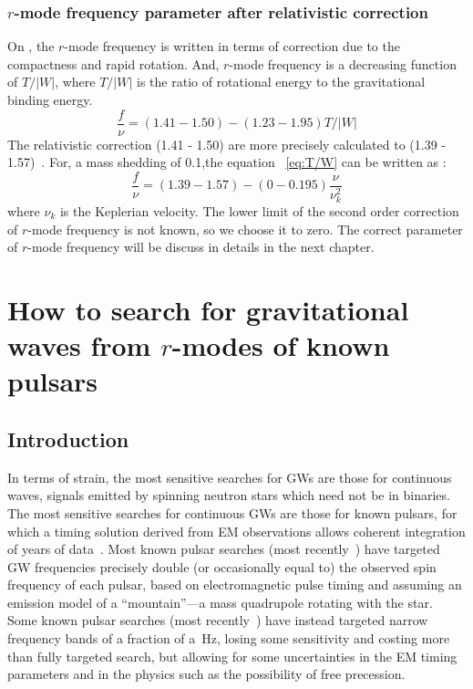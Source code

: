 \documentclass{ttuthes2007}
\begin{document}
\subsection{$r$-mode frequency parameter after relativistic correction}
On \cite{Yoshida:2004gk} , the $r$-mode frequency is written in terms of correction due to the
compactness and rapid rotation. And, $r$-mode frequency is a decreasing function
of $T/|W|$, where $T/|W|$ is the ratio of rotational energy to the gravitational
binding energy. 
\begin{equation}\label{eq:T/W}
\frac{f}{\nu}=(1.41 - 1.50) - (1.23-1.95)T/|W|
\end{equation}	
The relativistic correction (1.41 - 1.50) are more precisely calculated to (1.39
- 1.57)~\cite{Idrisy_2015}. For, a mass shedding of 0.1,the equation ~\ref{eq:T/W} can be written as :
\begin{equation}
\frac{f}{\nu}=(1.39 - 1.57) - (0-0.195)\frac{\nu}{\nu_k^2}
\end{equation}	
where $\nu_k$ is the Keplerian velocity. The lower limit of the second order
correction of $r$-mode frequency is not known, so we choose it to zero. The
correct parameter of $r$-mode frequency will be discuss in details in the next
chapter. 

\chapter{How to search for gravitational waves from $r$-modes of known pulsars}
\section{Introduction}

In terms of strain, the most sensitive searches for \acp{GW} are those for
continuous waves, signals emitted by spinning neutron stars which need not be
in binaries.
The most sensitive searches for continuous \acp{GW} are those for known
pulsars, for which a timing solution derived from \ac{EM} observations
allows coherent integration of years of data~\cite[and references
therein]{Riles:2017evm}.
Most known pulsar searches (most recently~\cite{Authors:2019ztc}) have
targeted \ac{GW} frequencies precisely double (or occasionally equal to) the
observed spin frequency of each pulsar, based on electromagnetic pulse timing
and assuming an emission model of a ``mountain''---a mass quadrupole rotating
with the star.
Some known pulsar searches (most recently~\cite{Abbott:2019bed}) have instead
targeted narrow frequency bands of a fraction of a~Hz, losing some sensitivity
and costing more than fully targeted search, but allowing for some
uncertainties in the \ac{EM} timing parameters and in the physics such as the
possibility of free precession.
\end{document}

